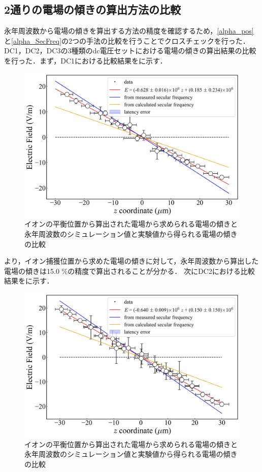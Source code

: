 \subsection{2通りの電場の傾きの算出方法の比較}
永年周波数から電場の傾きを算出する方法の精度を確認するため，\ref{alpha_pos}と\ref{alpha_SecFreq}の2つの手法の比較を行うことでクロスチェックを行った．DC1，DC2，DC3の3種類のdc電圧セットにおける電場の傾きの算出結果の比較を行った．まず，DC1における比較結果をに示す．

\begin{figure}[h]
	\begin{center}
		\includegraphics[width = 0.6\linewidth]{./results/figure/DC1_COMP.jpg}
		\caption{イオンの平衡位置から算出された電場から求められる電場の傾きと永年周波数のシミュレーション値と実験値から得られる電場の傾きの比較}
		\label{fig:DC1_COMP}
	\end{center}
\end{figure}

より，イオン捕獲位置から求めた電場の傾きに対して，永年周波数から算出した電場の傾きは15.0 \%の精度で算出されることが分かる．
%
\clearpage
%
次にDC2における比較結果をに示す．

\begin{figure}[h]
	\begin{center}
		\includegraphics[width = 0.6\linewidth]{./results/figure/DC2_COMP.jpg}
		\caption{イオンの平衡位置から算出された電場から求められる電場の傾きと永年周波数のシミュレーション値と実験値から得られる電場の傾きの比較}
		\label{fig:DC2_COMP}
	\end{center}
\end{figure}

